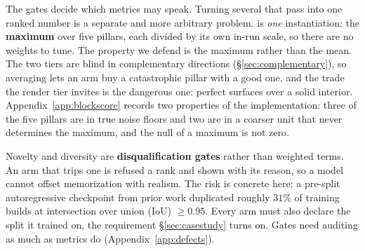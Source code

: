 The gates decide which metrics may speak. Turning several that pass into one ranked
number is a separate and more arbitrary problem. \blockscore{} is \emph{one} instantiation: the \textbf{maximum} over five pillars, each
divided by its own in-run scale, so there are no weights to tune. The property we defend is the maximum rather than the mean. The two tiers are
blind in complementary directions (\S\ref{sec:complementary}), so averaging lets an arm
buy a catastrophic pillar with a good one, and the trade the render tier invites is the
dangerous one: perfect surfaces over a solid interior.  Appendix~\ref{app:blockscore} records two properties of
the implementation: three of the five pillars are in true noise floors and two are in a
coarser unit that never determines the maximum, and the null of a maximum is not zero.

Novelty and diversity are \textbf{disqualification gates} rather than weighted terms.
An arm that trips one is refused a rank and shown with its reason, so a model cannot
offset memorization with realism. The risk is concrete here: a pre-split autoregressive
checkpoint from prior work duplicated roughly $31\%$ of training builds at intersection
over union (IoU) $\geq 0.95$. Every arm must also declare the split it trained on, the
requirement \S\ref{sec:casestudy} turns on. Gates need auditing as much as metrics do
(Appendix~\ref{app:defects}).
